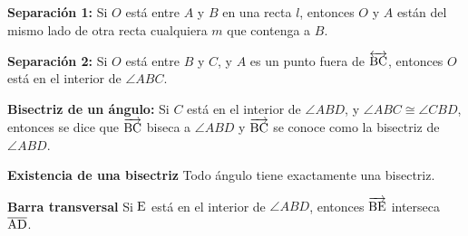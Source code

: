 \begin{theorem}{\textbf{Separación 1:}}
    Si $O$ está entre $A$ y $B$ en una recta $l$, entonces $O$ y $A$ están del mismo lado de otra recta cualquiera $m$ que contenga a $B$.
\end{theorem}

\begin{theorem}{\textbf{Separación 2:}}
    Si $O$ está entre $B$ y $C$, y $A$ es un punto fuera de $\overleftrightarrow{\rm BC}$, entonces $O$ está en el interior de $\angle{ABC}$.
\end{theorem}

\begin{definition}{\textbf{Bisectriz de un ángulo:}}
    Si $C$ está en el interior de $\angle{ABD}$, y $\angle{ABC} \cong \angle{CBD}$, entonces se dice que $\overrightarrow{\rm BC}$ biseca a $\angle{ABD}$ y $\overrightarrow{\rm BC}$ se conoce como la bisectriz de $\angle{ABD}$. 

    \begin{figure}[!h]
        \centering
        
        \label{fig:angle-bisector}
    \end{figure}
    
\end{definition}

\begin{theorem}{\textbf{Existencia de una bisectriz}}
    Todo ángulo tiene exactamente una bisectriz.
\end{theorem}

\begin{theorem}{\textbf{Barra transversal}}
    Si $\rm E$ está en el interior de $\angle{ABD}$, entonces $\overrightarrow{\rm BE}$ interseca $\overline{\rm AD}$.
\end{theorem}